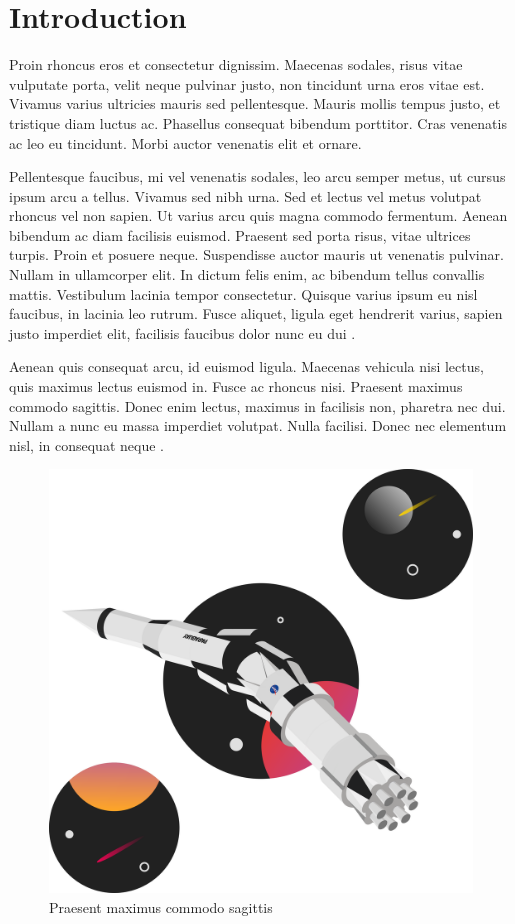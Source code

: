 \section{Introduction}

Proin rhoncus eros et consectetur dignissim. Maecenas sodales, risus vitae vulputate
porta, velit neque pulvinar justo, non tincidunt urna eros vitae est. Vivamus varius
ultricies mauris sed pellentesque. Mauris mollis tempus justo, et tristique diam
luctus ac. Phasellus consequat bibendum porttitor. Cras venenatis ac leo eu tincidunt.
Morbi auctor venenatis elit et ornare.

Pellentesque faucibus, mi vel venenatis sodales, leo arcu semper metus, ut cursus
ipsum arcu a tellus. Vivamus sed nibh urna. Sed et lectus vel metus volutpat rhoncus
vel non sapien. Ut varius arcu quis magna commodo fermentum. Aenean bibendum ac
diam facilisis euismod. Praesent sed porta risus, vitae ultrices turpis. Proin et
posuere neque. Suspendisse auctor mauris ut venenatis pulvinar. Nullam in ullamcorper
elit. In dictum felis enim, ac bibendum tellus convallis mattis. Vestibulum lacinia
tempor consectetur. Quisque varius ipsum eu nisl faucibus, in lacinia leo rutrum.
Fusce aliquet, ligula eget hendrerit varius, sapien justo imperdiet elit, facilisis
faucibus dolor nunc eu dui .

Aenean quis consequat arcu, id euismod ligula. Maecenas vehicula nisi lectus, quis
maximus lectus euismod in. Fusce ac rhoncus nisi. Praesent maximus commodo sagittis.
Donec enim lectus, maximus in facilisis non, pharetra nec dui. Nullam a nunc eu
massa imperdiet volutpat. Nulla facilisi. Donec nec elementum nisl, in consequat
neque \cite[p.100]{stephenson1998}.

\begin{figure}[ht]
    \centering
    \includegraphics[scale=0.2]{images/catastrophic-failure.png}
    \caption{Praesent maximus commodo sagittis}\label{fig:test}
\end{figure}